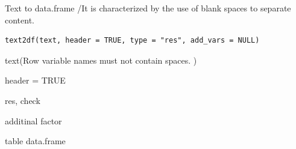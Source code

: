 \documentclass[a4paper]{book}
\begin{document}
%
\begin{Description}
Text to data.frame /It is characterized by the use of blank spaces to separate content.
\end{Description}
%
\begin{Usage}
\begin{verbatim}
text2df(text, header = TRUE, type = "res", add_vars = NULL)
\end{verbatim}
\end{Usage}
%
\begin{Arguments}
\begin{ldescription}
\item[\code{text}] text(Row variable names must not contain spaces. )

\item[\code{header}] header = TRUE

\item[\code{type}] res, check

\item[\code{add\_vars}] additinal factor
\end{ldescription}
\end{Arguments}
%
\begin{Value}
table data.frame
\end{Value}
%
\end{document}
